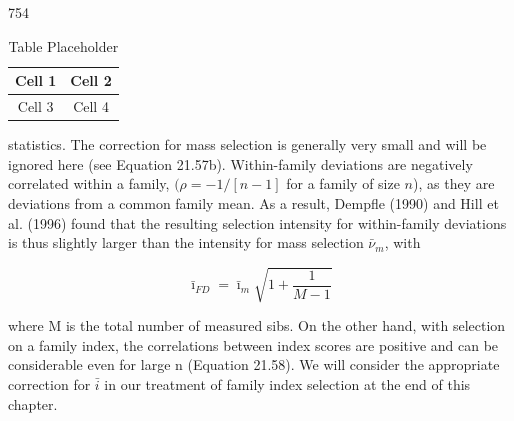\documentclass{article}
\begin{document}
754

\begin{table}[h]
\centering
\begin{tabular}{|c|c|}
\hline
Cell 1 & Cell 2 \\
\hline
Cell 3 & Cell 4 \\
\hline
\end{tabular}
\caption{Table Placeholder}
\end{table}

statistics. The correction for mass selection is generally very small and will be ignored here (see Equation 21.57b). Within-family deviations are negatively correlated within a family,  $ (\rho = -1/[n - 1] $ for a family of size  $ n $), as they are deviations from a common family mean. As a result, Dempfle (1990) and Hill et al. (1996) found that the resulting selection intensity for within-family deviations is thus slightly larger than the intensity for mass selection  $ \bar{\nu}_m $, with

\begin{equation}
\bar{\imath}_{FD}=\bar{\imath}_{m}\sqrt{1+\frac{1}{M-1}}
\tag{21.40}
\label{eq:21_40}
\end{equation}

where M is the total number of measured sibs. On the other hand, with selection on a family index, the correlations between index scores are positive and can be considerable even for large n (Equation 21.58). We will consider the appropriate correction for  $ \bar{i} $ in our treatment of family index selection at the end of this chapter.
\end{document}
